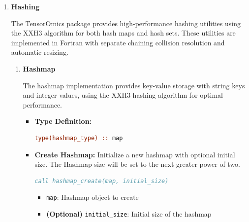 \documentclass[11pt]{article}
\begin{document}
\begin{enumerate}
\begin{enumerate}
\begin{itemize}
	      	      	\item \texttt{ierr integer(int32)}: Error code
	      	      \end{itemize}
	      	      \begin{lstlisting}[language=Fortran]
call get_kd_point(points, kd_indices, position, point_values, ierr)
	      	      \end{lstlisting}
	      \end{enumerate}
	      \item \textbf{Hashing}
	      
	      The TensorOmics package provides high-performance hashing utilities using the
	      XXH3 algorithm for both hash maps and hash sets. These utilities are
	      implemented in Fortran with separate chaining collision resolution and
	      automatic resizing.
	      
	      \begin{enumerate}
	      	\item \textbf{Hashmap}
	      	      
	      	      The hashmap implementation provides key-value storage with string keys
	      	      and integer values, using the XXH3 hashing algorithm for optimal
	      	      performance.
	      	      
	      	      \begin{itemize}
	      	      	\item \textbf{Type Definition:}
	      	      	      \begin{lstlisting}[language=Fortran]
type(hashmap_type) :: map
	      	      	      \end{lstlisting}
	      	      	      
	      	      	\item \textbf{Create Hashmap:} Initialize a new hashmap with optional initial size. The Hashmap size will be set to the next greater
	      	      	      power of two.
	      	      	      \begin{lstlisting}[language=Fortran]
call hashmap_create(map, initial_size)
	      	      	      \end{lstlisting}
	      	      	      \begin{itemize}
	      	      	      	\item \texttt{map}: Hashmap object to create
	      	      	      	      
	      	      	      	\item \textbf{(Optional)} \texttt{initial\_size}: Initial size
	      	      	      	      of the hashmap
	      	      	      \end{itemize}
	      	      	      

\end{itemize}
\end{enumerate}
\end{enumerate}
\end{document}
